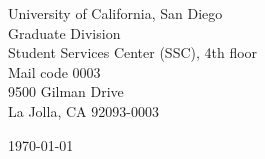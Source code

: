 \begin{minipage}{0.49\textwidth}
\begin{flushleft}
\noindent
University of California, San Diego \\
Graduate Division \\
Student Services Center (SSC), 4th floor \\
Mail code 0003 \\
9500 Gilman Drive \\
La Jolla, CA 92093-0003
\end{flushleft}
\end{minipage}
\begin{minipage}{0.47\textwidth}
\begin{flushright}
\today
\end{flushright}
\end{minipage} \\

\newcommand{\univ}{University of California, San Diego}
\newcommand{\univshort}{UCSD}
\newcommand{\degree}{Ph.D.}
\newcommand{\dept}{Computer Science}
